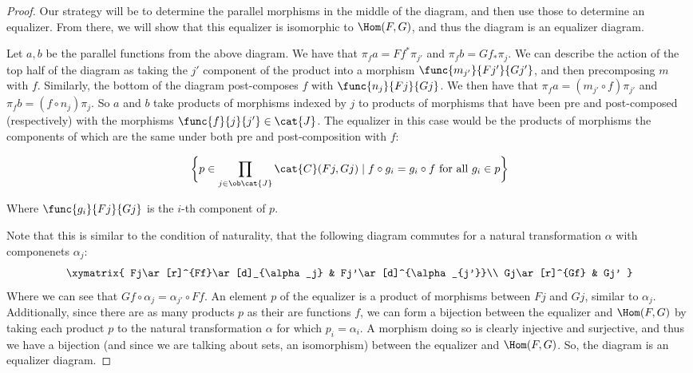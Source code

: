 \documentclass[main.tex]{subfiles}
\begin{document}
\begin{proof}
	Our strategy will be to determine the parallel morphisms in the middle of the diagram, and then use those to determine an equalizer. From there, we will show that this equalizer is isomorphic to $\Hom(F,G)$, and thus the diagram is an equalizer diagram.
	
	Let $a,b$ be the parallel functions from the above diagram. We have
	that $\pi_f a = Ff^\ast\pi_{j'}$ and $\pi_f b = Gf_\ast \pi_j$. We can
	describe the action of the top half of the diagram as taking the $j'$
	component of the product into a morphism $\func{m_{j'}}{Fj'}{Gj'}$, and
	then precomposing $m$ with $f$. Similarly, the bottom of the diagram
	post-composes $f$ with $\func{n_j}{Fj}{Gj}$. We then have that $\pi_f a
	= (m_{j'}\circ f)\pi_{j'}$ and $\pi_f b = (f\circ n_j)\pi_j$. So $a$
	and $b$ take products of morphisms indexed by $j$ to products of
	morphisms that have been pre and post-composed (respectively) with the
	morphisms $\func{f}{j}{j'}\in\cat{J}$. The equalizer in this case would
	be the products of morphisms the components of which are the same under
	both pre and post-composition with $f$:
	
	$$\bigg\{p\in\prod\limits_{j\in\ob\cat{J}}\cat{C}(Fj,Gj)\mid f\circ g_i
	= g_i\circ f \text{ for all } g_i\in p\bigg\}$$
	
	Where $\func{g_i}{Fj}{Gj}$ is the $i$-th component of $p$.
	
	Note that this is similar to the condition of naturality, that the
	following diagram commutes for a natural transformation $\alpha$ with
	componenets $\alpha_j$:
	$$
	\xymatrix{
		Fj\ar[r]^{Ff}\ar[d]_{\alpha_j} & Fj'\ar[d]^{\alpha_{j'}}\\
		Gj\ar[r]^{Gf} & Gj'
	}
	$$
	Where we can see that $Gf\circ \alpha_j = \alpha_{j'}\circ Ff$. An
	element $p$ of the equalizer is a product of morphisms between $Fj$ and
	$Gj$, similar to $\alpha_j$. Additionally, since there are as many
	products $p$ as their are functions $f$, we can form a bijection
	between the equalizer and $\Hom(F,G)$ by taking each product $p$ to the
	natural transformation $\alpha$ for which $p_i = \alpha_i$. A morphism
	doing so is clearly injective and surjective, and thus we have a
	bijection (and since we are talking about sets, an isomorphism) between
	the equalizer and $\Hom(F,G)$. So, the diagram is an equalizer diagram.

\end{proof}
\end{document}
